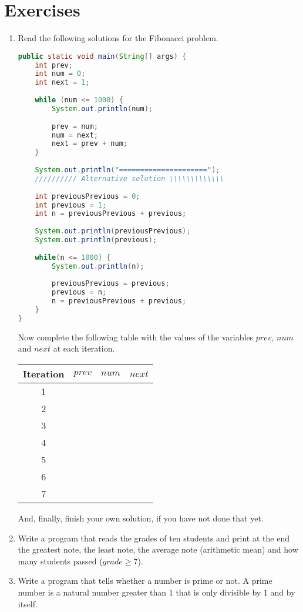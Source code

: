 \documentclass[a4paper]{article}
\begin{document}
	
	
	
	\section{Exercises}
	\begin{enumerate}
		\item Read the following solutions for the Fibonacci problem.
		\begin{lstlisting}[language=Java, basicstyle=\scriptsize]
public static void main(String[] args) {
	int prev;
	int num = 0;
	int next = 1;
	
	while (num <= 1000) {
		System.out.println(num);
		
		prev = num;
		num = next;
		next = prev + num;
	}
		
	System.out.println("=====================");
	////////// Alternative solution \\\\\\\\\\\\\
	
	int previousPrevious = 0;
	int previous = 1;
	int n = previousPrevious + previous;
		
	System.out.println(previousPrevious);
	System.out.println(previous);
		
	while(n <= 1000) {
		System.out.println(n);
		
		previousPrevious = previous;
		previous = n;
		n = previousPrevious + previous;
	}
}
		\end{lstlisting}
		Now complete the following table with the values of the variables $prev$, $num$ and $next$ at each iteration.
		\begin{table}[h!]
			\centering
			\begin{tabular}{| c | c | c | c |}
				\hline
				Iteration & $prev$ & $num$ & $next$ \\
				\hline
				1 & & & \\
				2 & & & \\
				3 & & & \\
				4 & & & \\
				5 & & & \\
				6 & & & \\
				7 & & & \\
				\hline
			\end{tabular}
		\end{table}
		And, finally, finish your own solution, if you have not done that yet.
		\item Write a program that reads the grades of ten students and print at the end the greatest note, the least note, the average note (arithmetic mean) and how many students passed ($grade \ge 7$).
		\item Write a program that tells whether a number is prime or not. A prime number is a natural number greater than 1 that is only divisible by 1 and by itself.
	\end{enumerate}
	
\end{document}
